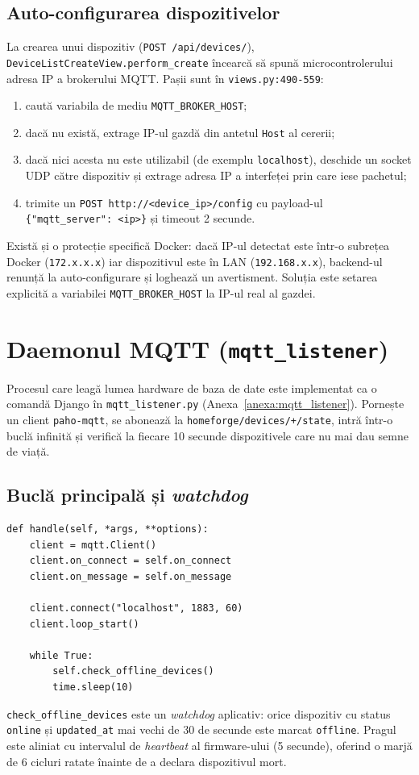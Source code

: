 \subsection{Auto-configurarea dispozitivelor}
La crearea unui dispozitiv (\texttt{POST /api/devices/}), \texttt{DeviceListCreateView.perform\_create} încearcă să spună microcontrolerului adresa IP a brokerului MQTT. Pașii sunt în \texttt{views.py:490-559}:
\begin{enumerate}
    \item caută variabila de mediu \texttt{MQTT\_BROKER\_HOST};
    \item dacă nu există, extrage IP-ul gazdă din antetul \texttt{Host} al cererii;
    \item dacă nici acesta nu este utilizabil (de exemplu \texttt{localhost}), deschide un socket UDP către dispozitiv și extrage adresa IP a interfeței prin care iese pachetul;
    \item trimite un \texttt{POST http://<device\_ip>/config} cu payload-ul \texttt{\{"mqtt\_server": <ip>\}} și timeout 2 secunde.
\end{enumerate}
Există și o protecție specifică Docker: dacă IP-ul detectat este într-o subrețea Docker (\texttt{172.x.x.x}) iar dispozitivul este în LAN (\texttt{192.168.x.x}), backend-ul renunță la auto-configurare și loghează un avertisment. Soluția este setarea explicită a variabilei \texttt{MQTT\_BROKER\_HOST} la IP-ul real al gazdei.

\section{Daemonul MQTT (\texttt{mqtt\_listener})}
Procesul care leagă lumea hardware de baza de date este implementat ca o comandă Django în \texttt{mqtt\_listener.py} (Anexa~\ref{anexa:mqtt_listener}). Pornește un client \texttt{paho-mqtt}, se abonează la \texttt{homeforge/devices/+/state}, intră într-o buclă infinită și verifică la fiecare 10 secunde dispozitivele care nu mai dau semne de viață.

\subsection{Buclă principală și \textit{watchdog}}
\begin{verbatim}
def handle(self, *args, **options):
    client = mqtt.Client()
    client.on_connect = self.on_connect
    client.on_message = self.on_message

    client.connect("localhost", 1883, 60)
    client.loop_start()

    while True:
        self.check_offline_devices()
        time.sleep(10)
\end{verbatim}
\texttt{check\_offline\_devices} este un \textit{watchdog} aplicativ: orice dispozitiv cu status \texttt{online} și \texttt{updated\_at} mai vechi de 30 de secunde este marcat \texttt{offline}. Pragul este aliniat cu intervalul de \textit{heartbeat} al firmware-ului (5 secunde), oferind o marjă de 6 cicluri ratate înainte de a declara dispozitivul mort.

